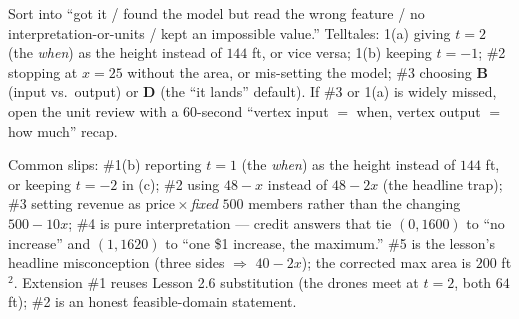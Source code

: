 \documentclass[10pt]{article}
\begin{document}
\begin{teachernote}
Sort into ``got it / found the model but read the wrong feature / no interpretation-or-units / kept an impossible
value.'' Telltales: 1(a) giving $t=2$ (the \emph{when}) as the height instead of $144$ ft, or vice versa; 1(b)
keeping $t=-1$; \#2 stopping at $x=25$ without the area, or mis-setting the model; \#3 choosing \textbf{B} (input vs.\
output) or \textbf{D} (the ``it lands'' default). If \#3 or 1(a) is widely missed, open the unit review with a
60-second ``vertex input $=$ when, vertex output $=$ how much'' recap.
\end{teachernote}

\begin{teachernote}[Homework]
Common slips: \#1(b) reporting $t=1$ (the \emph{when}) as the height instead of $144$ ft, or keeping $t=-2$ in (c);
\#2 using $48-x$ instead of $48-2x$ (the headline trap); \#3 setting revenue as price\,$\times$\,\emph{fixed} $500$
members rather than the changing $500-10x$; \#4 is pure interpretation --- credit answers that tie $(0,1600)$ to ``no
increase'' and $(1,1620)$ to ``one \$1 increase, the maximum.'' \#5 is the lesson's headline misconception (three
sides $\Rightarrow$ $40-2x$); the corrected max area is $200$ ft$^2$. Extension \#1 reuses Lesson 2.6 substitution
(the drones meet at $t=2$, both $64$ ft); \#2 is an honest feasible-domain statement.
\end{teachernote}
\end{document}
